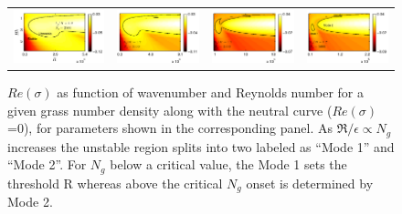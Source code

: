 \documentclass[aps,prl,twocolumn,showpacs,superscriptaddress,groupedaddress,10pt]{revtex4-1}  %
\newcommand{\Rey}{\text{R}}
\begin{document}
\begin{figure}
\begin{tabular}{cccc}
{\includegraphics[scale = 0.72]{Set6_dens32_imgsc}} &
{\includegraphics[scale = 0.72]{Set6_dens34_imgsc}} &
{\includegraphics[scale = 0.72]{Set6_dens36_imgsc}} &
{\includegraphics[scale = 0.72]{Set6_dens38_imgsc}}
\end{tabular}

\caption{$Re(\sigma)$ as function of wavenumber and Reynolds number for a given grass number density along with the neutral curve ($Re(\sigma)$=0), for parameters shown in the corresponding panel.  
As $\Re/\epsilon \propto N_g$ increases the unstable region splits into two labeled as ``Mode 1'' and ``Mode 2''. For $N_g$ below
a critical value, the Mode 1 sets the threshold $\Rey$ whereas above the critical $N_{g}$ onset is determined by Mode 2.}
\label{K_Re_sigma_set3}
\end{figure}
\end{document}

